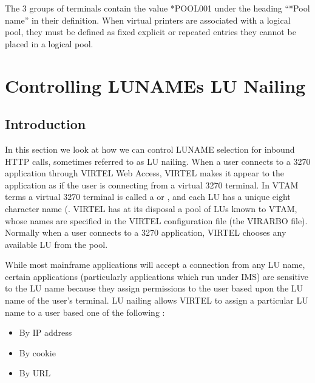 \documentclass[letterpaper,10pt,english]{sphinxmanual}
\begin{document}
\sphinxAtStartPar
The 3 groups of terminals contain the value *POOL001 under the heading “*Pool name” in their definition. When virtual printers are associated with a logical pool, they must be defined as fixed explicit or repeated entries \textendash{} they cannot be placed in a logical pool.

\ignorespaces 

\chapter{Controlling LUNAMEs \sphinxhyphen{} LU Nailing}
\label{\detokenize{connectivity_guide:controlling-lunames-lu-nailing}}\label{\detokenize{connectivity_guide:v461cn-forceluname}}\label{\detokenize{connectivity_guide:index-149}}

\section{Introduction}
\label{\detokenize{connectivity_guide:id72}}
\sphinxAtStartPar
In this section we look at how we can control LUNAME selection for inbound HTTP calls, sometimes referred to as LU nailing. When a user connects to a 3270 application through VIRTEL Web Access, VIRTEL makes it appear to the application as if the user is connecting from a virtual 3270 terminal. In VTAM terms a virtual 3270 terminal is called a  or , and each LU has a unique eight character name (. VIRTEL has at its disposal a pool of LUs known to VTAM, whose names are specified in the VIRTEL configuration file (the VIRARBO file). Normally when a user connects to a 3270 application, VIRTEL chooses any available LU from the pool.

\sphinxAtStartPar
While most mainframe applications will accept a connection from any LU name, certain applications (particularly applications which run under IMS) are sensitive to the LU name because they assign permissions to the user based upon the LU name of the user’s terminal. LU nailing allows VIRTEL to assign a particular LU name to a user based one of the following :\sphinxhyphen{}
\begin{itemize}
\item {} 
\sphinxAtStartPar
By IP address

\item {} 
\sphinxAtStartPar
By cookie

\item {} 
\sphinxAtStartPar
By URL

\end{itemize}
\end{document}
